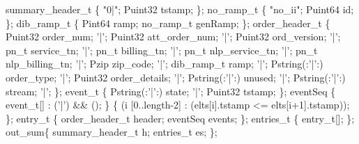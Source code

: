 \begin{code}
  summary\_header\_t \{
  "0|";  Puint32 tstamp;
\};
\mbox{}
 no\_ramp\_t \{
  "no\_ii";  Puint64 id;
\};
\mbox{}
 dib\_ramp\_t \{
  Pint64 ramp;  no\_ramp\_t genRamp;
\};
\mbox{}
 order\_header\_t \{
       Puint32             order\_num;
 '|';  Puint32             att\_order\_num;
 '|';  Puint32             ord\_version;
 '|';   pn\_t           service\_tn;
 '|';   pn\_t           billing\_tn;
 '|';   pn\_t           nlp\_service\_tn;
 '|';   pn\_t           nlp\_billing\_tn;
 '|';   Pzip           zip\_code;
 '|';  dib\_ramp\_t          ramp;
 '|';  Pstring(:'|':)      order\_type;
 '|';  Puint32             order\_details;
 '|';  Pstring(:'|':)      unused;
 '|';  Pstring(:'|':)      stream;
 '|';
\};
\mbox{}
 event\_t \{
  Pstring(:'|':) state;  '|';  Puint32 tstamp;
\};
\mbox{}
 eventSeq \{
  event\_t[] : ('|') && ();
\}  \{
   (i  [0..length-2] :
           (elts[i].tstamp <= elts[i+1].tstamp));
\};
\mbox{}
  entry\_t \{
  order\_header\_t  header;  eventSeq events;
\};
\mbox{}
 entries\_t \{
  entry\_t[];
\};
\mbox{}
  out\_sum\{
  summary\_header\_t  h;  entries\_t es;
\};
\end{code}
